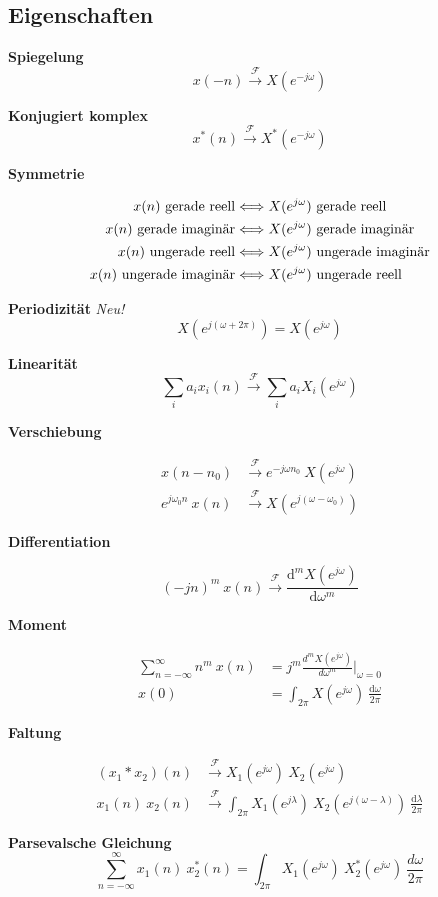 \documentclass[10pt,a4paper]{article}
\newcommand{\fancyformula}[2]{
	\small
	\raggedright\sffamily\textbf{#1}
	#2
}
\newcommand{\ftransform}{
	\xrightarrow{~\mathcal{F}~}
}
\begin{document}
\subsection*{Eigenschaften}
\begin{multicols}{2}
	
\fancyformula{Spiegelung}{\[ x(-n)\ftransform X \left(e^{-j\omega} \right) \]}
\fancyformula{Konjugiert komplex}{\[ x^*(n) \ftransform X^* \left(e^{-j\omega} \right)\]}
\fancyformula{Symmetrie}{
\begin{align*}
	x(n) \textnormal{ gerade reell} &\Longleftrightarrow X(e^{j\omega}) \textnormal{ gerade reell} \\
	x(n) \textnormal{ gerade imaginär} &\Longleftrightarrow X(e^{j\omega}) \textnormal{ gerade imaginär} \\
	x(n) \textnormal{ ungerade reell} &\Longleftrightarrow X(e^{j\omega}) \textnormal{ ungerade imaginär} \\
	x(n) \textnormal{ ungerade imaginär} &\Longleftrightarrow X(e^{j\omega}) \textnormal{ ungerade reell} \\
\end{align*}
}
\fancyformula{Periodizität}{\textit{Neu!} \[ X \left(e^{j(\omega + 2\pi)}\right) = X(e^{j\omega}) \]}
\fancyformula{Linearität}{\[ \sum_{i} a_i x_i(n) \ftransform \sum_{i} a_i X_i\left(e^{j\omega} \right)\]}
\fancyformula{Verschiebung}{
\begin{align*}
	x(n - n_0) &\ftransform e^{-j\omega n_0} ~ X\left(e^{j\omega} \right) \\
	e^{j\omega_0 n} ~ x(n) &\ftransform X \left(e^{j (\omega - \omega_0)} \right)
\end{align*}
}
\fancyformula{Differentiation}{
\[
	(-jn)^m ~ x(n) \ftransform \frac{\mathrm d^m X(e^{j\omega})}{\mathrm d\omega^m}
\]
}
\fancyformula{Moment}{
\begin{align*}
	\sum_{n=-\infty}^{\infty} n^m ~ x(n) &= j^m \frac{d^m X \left(e^{j\omega} \right)}{d\omega^m} \bigg|_{\omega=0} \\
	x(0) &= \int_{2\pi} X \left(e^{j\omega} \right) ~ \frac{\mathrm d\omega}{2\pi}
\end{align*}	
}
\fancyformula{Faltung}{
\begin{align*}
	(x_1 \ast x_2)(n) &\ftransform X_1 \left(e^{j\omega} \right) ~ X_2 \left(e^{j\omega} \right)\\
	x_1(n) ~ x_2(n) &\ftransform \int_{2\pi} X_1 \left(e^{j\lambda} \right) ~ X_2 \left(e^{j (\omega - \lambda)} \right) ~ \frac{\mathrm d\lambda}{2\pi}
\end{align*}
}
\fancyformula{Parsevalsche Gleichung}{\[ \sum_{n=-\infty}^{\infty}x_1(n) ~ x_2^*(n) = \int_{2 \pi} X_1 \left(e^{j\omega} \right) ~ X_2^* \left(e^{j\omega} \right) ~ \frac{d\omega}{2\pi} \]}
\end{multicols}
\end{document}
